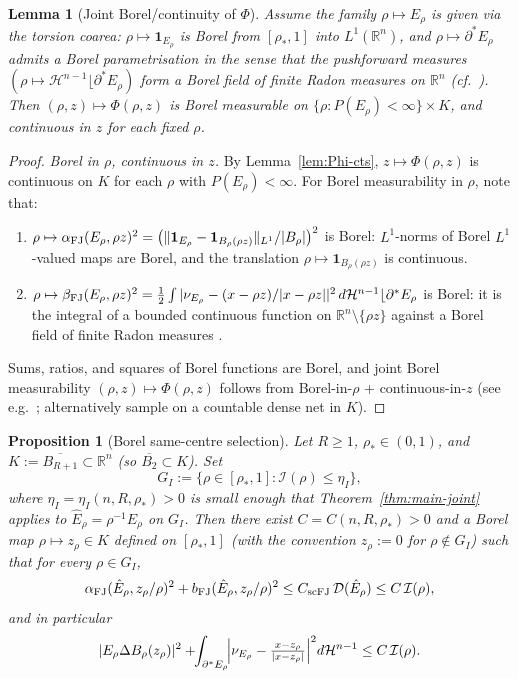 \documentclass[11pt]{article}
\newtheorem{proposition}[theorem]{Proposition}
\newtheorem{lemma}[theorem]{Lemma}
\theoremstyle{definition}
\newcommand{\R}{\mathbb{R}}
\newcommand{\Hn}{\mathcal H^{n-1}}
\newcommand{\rstar}{\rho_{*}}
\newcommand{\dD}{\mathcal D}
\newcommand{\alphaFJ}{\alpha_{\rm FJ}}
\newcommand{\bFJ}{b_{\rm FJ}}
\newcommand{\betaFJ}{\beta_{\rm FJ}}
\newcommand{\scFJ}{{\rm scFJ}}
\begin{document}
\begin{lemma}[Joint Borel/continuity of \(\Phi\)]\label{lem:Phi-Borel}
Assume the family \(\rho\mapsto E_\rho\) is given via the torsion
coarea: \(\rho\mapsto\mathbf 1_{E_\rho}\) is Borel from
\([\rstar,1]\) into \(L^{1}(\R^{n})\), and
\(\rho\mapsto\partial^{\ast}E_\rho\) admits a Borel
parametrisation in the sense that the pushforward measures
\((\rho\mapsto\Hn\lfloor\partial^{\ast}E_\rho)\) form a Borel field
of finite Radon measures on \(\R^{n}\) (cf.\ \cite[\S15]{Maggi2012}).
Then \((\rho,z)\mapsto\Phi(\rho,z)\) is Borel measurable on
\(\{\rho:P(E_\rho)<\infty\}\times K\), and continuous in \(z\) for
each fixed \(\rho\).
\end{lemma}

\begin{proof}
\emph{Borel in \(\rho\), continuous in \(z\).}  By
Lemma~\ref{lem:Phi-cts}, \(z\mapsto\Phi(\rho,z)\) is continuous on
\(K\) for each \(\rho\) with \(P(E_\rho)<\infty\).  For Borel
measurability in \(\rho\), note that:
\begin{enumerate}
\item \(\rho\mapsto\alphaFJ(E_\rho,\rho z)^{2}=
   \bigl(\|\mathbf 1_{E_\rho}-\mathbf 1_{B_\rho(\rho z)}\|_{L^{1}}/
      |B_\rho|\bigr)^{2}\) is Borel: \(L^{1}\)-norms of Borel
   \(L^{1}\)-valued maps are Borel, and the translation
   \(\rho\mapsto\mathbf 1_{B_\rho(\rho z)}\) is continuous.
\item \(\rho\mapsto\betaFJ(E_\rho,\rho z)^{2}=
   \tfrac12\int|\nu_{E_\rho}-(x-\rho z)/|x-\rho z||^{2}\,
   d\Hn\lfloor\partial^{\ast}E_\rho\) is Borel: it is the integral
   of a bounded continuous function on \(\R^n\setminus\{\rho z\}\)
   against a Borel field of finite Radon measures
   \cite[Prop.~15.10]{Maggi2012}.
\end{enumerate}
Sums, ratios, and squares of Borel functions are Borel, and joint
Borel measurability \((\rho,z)\mapsto\Phi(\rho,z)\) follows from
Borel-in-\(\rho\) + continuous-in-\(z\)
(see e.g.\ \cite[Lem.~III.14]{CastaingValadier1977}; alternatively
sample on a countable dense net in \(K\)).
\end{proof}

\begin{proposition}[Borel same-centre selection]\label{prop:selection}
Let \(R\ge1\), \(\rstar\in(0,1)\), and \(K:=\overline{B_{R+1}}\subset
\R^{n}\) (so \(\overline{B_{2}}\subset K\)).  Set
\[
   G_I:=\bigl\{\rho\in[\rstar,1]:
        \mathcal I(\rho)\le\eta_I\bigr\},
\]
where \(\eta_I=\eta_I(n,R,\rstar)>0\) is small enough that
Theorem~\ref{thm:main-joint} applies to \(\hat E_\rho=\rho^{-1}E_\rho\)
on \(G_I\).  Then there exist
\(C=C(n,R,\rstar)>0\) and a Borel map \(\rho\mapsto z_\rho\in K\)
defined on \([\rstar,1]\) (with the convention \(z_\rho:=0\) for
\(\rho\notin G_I\)) such that for every \(\rho\in G_I\),
\[
   \alphaFJ(\hat E_\rho,z_\rho/\rho)^{2}
      +\bFJ(\hat E_\rho,z_\rho/\rho)^{2}
      \le C_{\scFJ}\,\dD(\hat E_\rho)
   \le C\,\mathcal I(\rho),
\]
and in particular
\[
   |E_\rho\Delta B_\rho(z_\rho)|^{2}+\!\!\int_{\partial^{\ast}E_\rho}
      \!\Bigl|\nu_{E_\rho}-\tfrac{x-z_\rho}{|x-z_\rho|}\Bigr|^{2}d\Hn
   \le C\,\mathcal I(\rho).
\]
\end{proposition}
\end{document}
